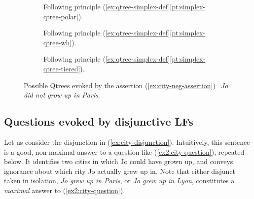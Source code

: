 \begin{figure}[H]
	\centering
	\begin{subfigure}[t]{.23\linewidth}
		\centering
		\caption{Following principle (\ref{ex:qtree-simplex-def}\ref{pt:simplex-qtree-polar}).}\label{fig:neg-city-qtree-polar}
	\end{subfigure}
	\hfill
	\begin{subfigure}[t]{.33\linewidth}
		\centering		{}
		\caption{Following principle (\ref{ex:qtree-simplex-def}\ref{pt:simplex-qtree-wh}).}\label{fig:neg-city-qtree-wh}
	\end{subfigure}
	\hfill
	\begin{subfigure}[t]{.38\linewidth}
		\centering{}
		\caption{Following principle (\ref{ex:qtree-simplex-def}\ref{pt:simplex-qtree-tiered}).}\label{fig:neg-city-qtree-tiered}
	\end{subfigure}
	\caption{Possible Qtrees evoked by the assertion (\ref{ex:city-neg-assertion})=\textit{Jo did not grow up in Paris}.}\label{fig:neg-city-qtrees}
\end{figure}


\subsection{Questions evoked by disjunctive LFs}

Let us consider the disjunction in (\ref{ex:city-disjunction}). Intuitively, this sentence is a good, non-maximal answer to a question like (\ref{ex2:city-question}), repeated below. It identifies two cities in which Jo could have grown up, and conveys ignorance about which city Jo actually grew up in. Note that either disjunct taken in isolation, \textit{Jo grew up in Paris}, or \textit{Jo grew up in Lyon}, constitutes a \textit{maximal} answer to (\ref{ex2:city-question}).

